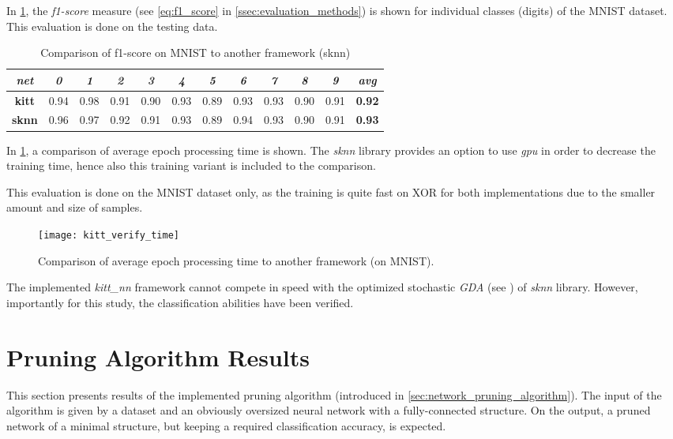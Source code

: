 In \cref{tab:kitt_verify_f1}, the \textit{f1-score} measure (see \cref{eq:f1_score} in \cref{ssec:evaluation_methods}) is shown for individual classes (digits) of the MNIST dataset. This evaluation is done on the testing data.

\begin{table}[H]
\centering
\caption{Comparison of f1-score on MNIST to another framework (sknn)}
\label{tab:kitt_verify_f1}
\resizebox{\textwidth}{!} {
\begin{tabular}{|c|c|c|c|c|c|c|c|c|c|c|c|}
\hline
\textit{net}  & \textit{0} & \textit{1} & \textit{2} & \textit{3} & \textit{4} & \textit{5} & \textit{6} & \textit{7} & \textit{8} & \textit{9} & \textit{avg}  \\ \hline
\textbf{kitt} & 0.94       & 0.98       & 0.91       & 0.90       & 0.93       & 0.89       & 0.93       & 0.93       & 0.90       & 0.91       & \textbf{0.92} \\ \hline
\textbf{sknn} & 0.96       & 0.97       & 0.92       & 0.91       & 0.93       & 0.89       & 0.94       & 0.93       & 0.90       & 0.91       & \textbf{0.93} \\ \hline
\end{tabular}
}
\end{table}

In \cref{fig:kitt_verify_time}, a comparison of average epoch processing time is shown. The \textit{sknn} library provides an option to use \textit{gpu} in order to decrease the training time, hence also this training variant is included to the comparison.

This evaluation is done on the MNIST dataset only, as the training is quite fast on XOR for both implementations due to the smaller amount and size of samples.

\begin{figure}[H]
  \centering
  \texttt{[image: kitt\_verify\_time]}
  \caption{Comparison of average epoch processing time to another framework (on MNIST).}
  \label{fig:kitt_verify_time}
\end{figure}

The implemented \textit{kitt\_nn} framework cannot compete in speed with the optimized stochastic \textit{GDA} (see \citep{misc:sknn}) of \textit{sknn} library. However, importantly for this study, the classification abilities have been verified.

\section{Pruning Algorithm Results} \label{sec:pruning_algorithm_results}
This section presents results of the implemented pruning algorithm (introduced in \cref{sec:network_pruning_algorithm}). The input of the algorithm is given by a dataset and an obviously oversized neural network with a fully-connected structure. On the output, a pruned network of a minimal structure, but keeping a required classification accuracy, is expected.

